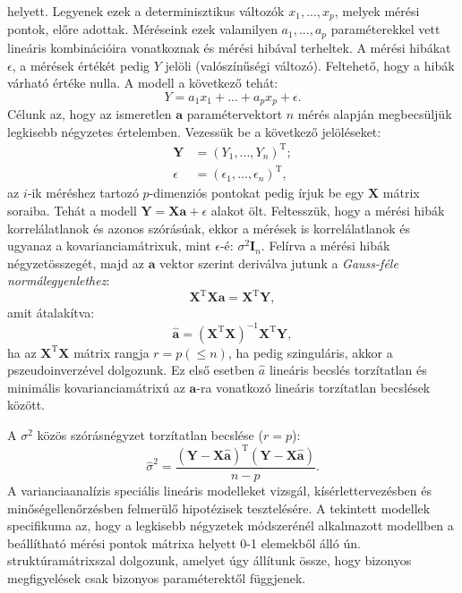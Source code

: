 \documentclass[DIV=15,appendixprefix]{scrreprt}
\theoremstyle{definition}
\theoremstyle{remark}
\DeclareMathOperator{\T}{T}
\begin{document}
helyett. Legyenek ezek a determinisztikus változók $x_1,...,x_p$, melyek mérési pontok, előre
adottak. Méréseink ezek valamilyen $a_1,...,a_p$ paraméterekkel vett lineáris kombinációira
vonatkoznak és mérési hibával terheltek. A mérési hibákat $\epsilon$, a mérések értékét pedig $Y$
jelöli (valószínűségi változó). Feltehető, hogy a hibák várható értéke nulla. A modell a következő
tehát:
\begin{equation*}
	Y=a_1 x_1 + ... + a_p x_p + \epsilon.
\end{equation*}
Célunk az, hogy az ismeretlen $\mathbf{a}$ paramétervektort $n$ mérés alapján megbecsüljük legkisebb
négyzetes értelemben. Vezessük be a következő jelöléseket:
\begin{align*}
	\mathbf{Y} &= \left(Y_1,...,Y_n\right)^{\T};\\
	\epsilon &= (\epsilon_1,...,\epsilon_n)^{\T},
\end{align*}
az $i$-ik méréshez tartozó $p$-dimenziós pontokat pedig írjuk be egy $\mathbf{X}$ mátrix soraiba.
Tehát a modell $\mathbf{Y}=\mathbf{X} \mathbf{a} + \epsilon$ alakot ölt. Feltesszük, hogy a mérési
hibák korrelálatlanok és azonos szórásúak, ekkor a mérések is korrelálatlanok és ugyanaz a
kovarianciamátrixuk, mint $\epsilon$-é: $\sigma^2 \mathbf{I}_n$. Felírva a mérési hibák
négyzetösszegét, majd
az $\mathbf{a}$ vektor szerint deriválva jutunk a \emph{Gauss-féle normálegyenlethez}:
\begin{equation*}
	\mathbf{X}^{\T} \mathbf{X} \mathbf{a} = \mathbf{X}^{\T} \mathbf{Y},
\end{equation*}
amit átalakítva:
\[
\hat{\mathbf{a} } =\left( \mathbf{X}^{\T} \mathbf{X} \right) ^{-1} \mathbf{X}^{\T} \mathbf{Y},
\]
ha az $\mathbf{X}^{\T} \mathbf{X}$ mátrix rangja $r=p \left( \le n \right) $, ha pedig szinguláris,
akkor a pszeudoinverzével dolgozunk. Ez első esetben $\hat{a}$ lineáris becslés torzítatlan és
minimális kovarianciamátrixú az $\mathbf{a}$-ra vonatkozó lineáris torzítatlan becslések között.

A $\sigma ^2$ közös szórásnégyzet torzítatlan becslése ($r=p$):
\begin{equation*}
	\hat{\sigma}^2 =\frac{ \left( \mathbf{ Y } - \mathbf{ X } \hat{\mathbf{a} } \right) ^{ \T }
	\left( \mathbf{ Y } - \mathbf{ X } \hat{\mathbf{a} } \right) }{n-p}.
\end{equation*}
%
A varianciaanalízis speciális lineáris modelleket vizsgál, kísérlettervezésben és
minőségellenőrzésben felmerülő hipotézisek tesztelésére. A tekintett modellek
specifikuma az, hogy a legkisebb négyzetek módszerénél alkalmazott modellben a beállítható mérési
pontok mátrixa helyett 0-1 elemekből álló ún. struktúramátrixszal dolgozunk, amelyet úgy állítunk
össze, hogy bizonyos megfigyelések csak bizonyos paraméterektől függjenek.
\end{document}
